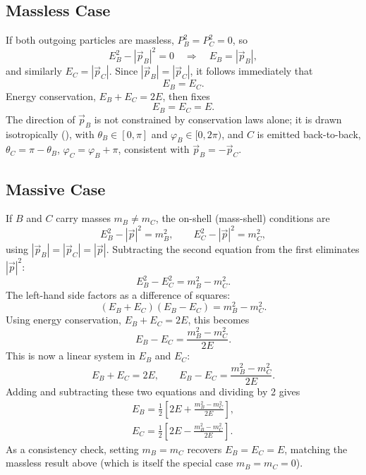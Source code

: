 \documentclass{article}
\begin{document}
\subsection{Massless Case}
If both outgoing particles are massless, $P_B^2 = P_C^2 = 0$, so
\begin{equation}
    E_B^2 - |\vec{p}_B|^2 = 0 \quad \Rightarrow \quad E_B = |\vec{p}_B|,
\end{equation}
and similarly $E_C = |\vec{p}_C|$. Since $|\vec{p}_B| = |\vec{p}_C|$, it follows immediately that
\begin{equation}
    E_B = E_C.
\end{equation}
Energy conservation, $E_B + E_C = 2E$, then fixes
\begin{equation}
    E_B = E_C = E.
\end{equation}
The direction of $\vec{p}_B$ is not constrained by conservation laws alone; it is drawn isotropically (), with $\theta_B \in [0,\pi]$ and $\varphi_B \in [0, 2\pi)$, and $C$ is emitted back-to-back, $\theta_C = \pi - \theta_B$, $\varphi_C = \varphi_B + \pi$, consistent with $\vec{p}_B = -\vec{p}_C$.

\subsection{Massive Case}
If $B$ and $C$ carry masses $m_B \neq m_C$, the on-shell (mass-shell) conditions are
\begin{equation}
    E_B^2 - |\vec{p}|^2 = m_B^2, \qquad E_C^2 - |\vec{p}|^2 = m_C^2,
\end{equation}
using $|\vec{p}_B| = |\vec{p}_C| = |\vec{p}|$. Subtracting the second equation from the first eliminates $|\vec{p}|^2$:
\begin{equation}
    E_B^2 - E_C^2 = m_B^2 - m_C^2.
\end{equation}
The left-hand side factors as a difference of squares:
\begin{equation}
    (E_B + E_C)(E_B - E_C) = m_B^2 - m_C^2.
\end{equation}
Using energy conservation, $E_B + E_C = 2E$, this becomes
\begin{equation}
    E_B - E_C = \frac{m_B^2 - m_C^2}{2E}.
\end{equation}
This is now a linear system in $E_B$ and $E_C$:
\begin{equation}
    E_B + E_C = 2E, \qquad E_B - E_C = \frac{m_B^2 - m_C^2}{2E}.
\end{equation}
Adding and subtracting these two equations and dividing by 2 gives
\begin{equation}
\begin{gathered}
    E_B = \frac{1}{2}\left[2E + \frac{m_B^2 - m_C^2}{2E}\right], \\
    E_C = \frac{1}{2}\left[2E - \frac{m_B^2 - m_C^2}{2E}\right].
\end{gathered}
\end{equation}
As a consistency check, setting $m_B = m_C$ recovers $E_B = E_C = E$, matching the massless result above (which is itself the special case $m_B = m_C = 0$).
\end{document}
